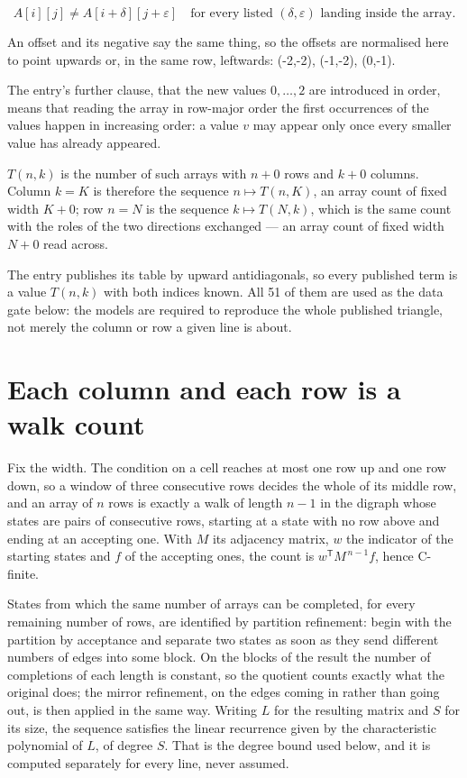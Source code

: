 \documentclass[11pt]{article}
\theoremstyle{definition}
\begin{document}
\[A[i][j] \ne A[i{+}\delta][j{+}\varepsilon]\quad\text{for every listed }(\delta,\varepsilon)\text{ landing inside the array.}\]

An offset and its negative say the same thing, so the offsets are normalised here to point upwards or, in the same row, leftwards: (-2,-2), (-1,-2), (0,-1).

The entry's further clause, that the new values $0,\dots,2$ are introduced in order, means that reading the array in row-major order the first occurrences of the values happen in increasing order: a value $v$ may appear only once every smaller value has already appeared.

$T(n,k)$ is the number of such arrays with $n + 0$ rows and $k + 0$ columns. Column $k = K$ is therefore the sequence $n \mapsto T(n,K)$, an array count of fixed width $K + 0$; row $n = N$ is the sequence $k \mapsto T(N,k)$, which is the same count with the roles of the two directions exchanged --- an array count of fixed width $N + 0$ read across.

The entry publishes its table by upward antidiagonals, so every published term is a value $T(n,k)$ with both indices known. All 51 of them are used as the data gate below: the models are required to reproduce the whole published triangle, not merely the column or row a given line is about.

\section{Each column and each row is a walk count}

Fix the width. The condition on a cell reaches at most one row up and one row down, so a window of three consecutive rows decides the whole of its middle row, and an array of $n$ rows is exactly a walk of length $n-1$ in the digraph whose states are pairs of consecutive rows, starting at a state with no row above and ending at an accepting one. With $M$ its adjacency matrix, $w$ the indicator of the starting states and $f$ of the accepting ones, the count is $w^{\mathsf T}M^{\,n-1}f$, hence C-finite.

States from which the same number of arrays can be completed, for every remaining number of rows, are identified by partition refinement: begin with the partition by acceptance and separate two states as soon as they send different numbers of edges into some block. On the blocks of the result the number of completions of each length is constant, so the quotient counts exactly what the original does; the mirror refinement, on the edges coming in rather than going out, is then applied in the same way. Writing $L$ for the resulting matrix and $S$ for its size, the sequence satisfies the linear recurrence given by the characteristic polynomial of $L$, of degree $S$. That is the degree bound used below, and it is computed separately for every line, never assumed.
\end{document}
